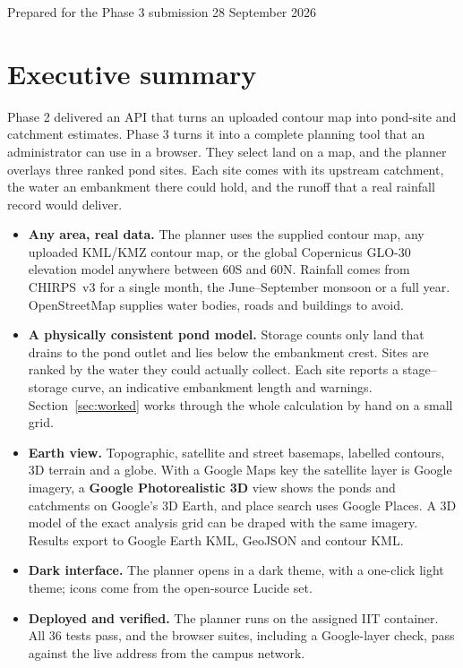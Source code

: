 \documentclass[11pt,a4paper]{article}
\begin{document}
\textcolor{muted}{\small Prepared for the Phase 3 submission \hfill 28 September 2026}
\newpage

\tableofcontents
\newpage

\section{Executive summary}
Phase 2 delivered an API that turns an uploaded contour map into pond-site and catchment estimates. Phase 3 turns it into a complete planning tool that an administrator can use in a browser. They select land on a map, and the planner overlays three ranked pond sites. Each site comes with its upstream catchment, the water an embankment there could hold, and the runoff that a real rainfall record would deliver.

\begin{keybox}[title=What Phase 3 delivers]
\begin{itemize}
\item \textbf{Any area, real data.} The planner uses the supplied contour map, any uploaded KML/KMZ contour map, or the global Copernicus GLO-30 elevation model anywhere between 60\textdegree S and 60\textdegree N. Rainfall comes from CHIRPS~v3 for a single month, the June--September monsoon or a full year. OpenStreetMap supplies water bodies, roads and buildings to avoid.
\item \textbf{A physically consistent pond model.} Storage counts only land that drains to the pond outlet and lies below the embankment crest. Sites are ranked by the water they could actually collect. Each site reports a stage--storage curve, an indicative embankment length and warnings. Section~\ref{sec:worked} works through the whole calculation by hand on a small grid.
\item \textbf{Earth view.} Topographic, satellite and street basemaps, labelled contours, 3D terrain and a globe. With a Google Maps key the satellite layer is Google imagery, a \textbf{Google Photorealistic 3D} view shows the ponds and catchments on Google's 3D Earth, and place search uses Google Places. A 3D model of the exact analysis grid can be draped with the same imagery. Results export to Google Earth KML, GeoJSON and contour KML.
\item \textbf{Dark interface.} The planner opens in a dark theme, with a one-click light theme; icons come from the open-source Lucide set.
\item \textbf{Deployed and verified.} The planner runs on the assigned IIT container. All 36 tests pass, and the browser suites, including a Google-layer check, pass against the live address from the campus network.
\end{itemize}
\end{keybox}
\end{document}
